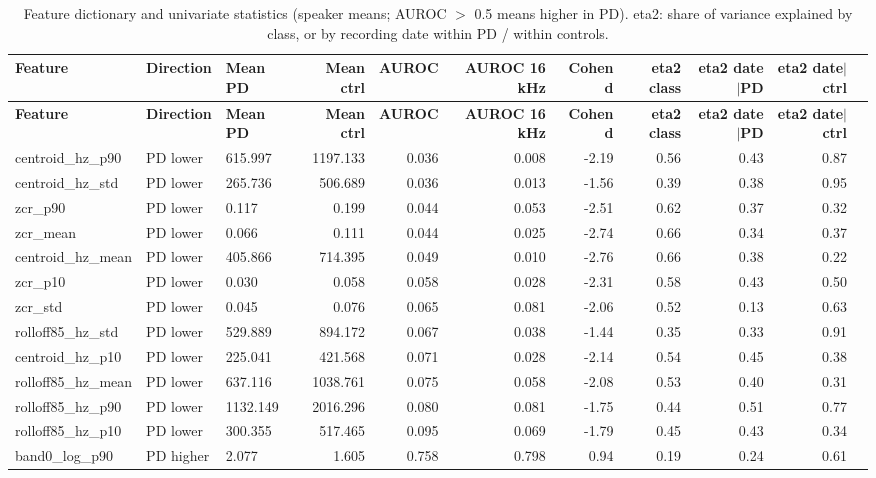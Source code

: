 \documentclass[10pt,a4paper]{article}
\begin{document}
\begin{center}\tiny\renewcommand{\arraystretch}{1.12}
\begin{longtable}{lllrrrrrrrr}
\caption{Feature dictionary and univariate statistics (speaker means; AUROC $>$ 0.5 means higher in PD). eta2: share of variance explained by class, or by recording date within PD / within controls.}\\
\toprule
\textbf{Feature} & \textbf{Direction} & \textbf{Mean PD} & \textbf{Mean ctrl} & \textbf{AUROC} & \textbf{AUROC 16 kHz} & \textbf{Cohen d} & \textbf{eta2 class} & \textbf{eta2 date$|$PD} & \textbf{eta2 date$|$ctrl}\\\midrule\endfirsthead
\toprule
\textbf{Feature} & \textbf{Direction} & \textbf{Mean PD} & \textbf{Mean ctrl} & \textbf{AUROC} & \textbf{AUROC 16 kHz} & \textbf{Cohen d} & \textbf{eta2 class} & \textbf{eta2 date$|$PD} & \textbf{eta2 date$|$ctrl}\\\midrule\endhead
\bottomrule\endfoot
centroid\_hz\_p90 & PD lower & 615.997 & 1197.133 & 0.036 & 0.008 & -2.19 & 0.56 & 0.43 & 0.87\\
centroid\_hz\_std & PD lower & 265.736 & 506.689 & 0.036 & 0.013 & -1.56 & 0.39 & 0.38 & 0.95\\
zcr\_p90 & PD lower & 0.117 & 0.199 & 0.044 & 0.053 & -2.51 & 0.62 & 0.37 & 0.32\\
zcr\_mean & PD lower & 0.066 & 0.111 & 0.044 & 0.025 & -2.74 & 0.66 & 0.34 & 0.37\\
centroid\_hz\_mean & PD lower & 405.866 & 714.395 & 0.049 & 0.010 & -2.76 & 0.66 & 0.38 & 0.22\\
zcr\_p10 & PD lower & 0.030 & 0.058 & 0.058 & 0.028 & -2.31 & 0.58 & 0.43 & 0.50\\
zcr\_std & PD lower & 0.045 & 0.076 & 0.065 & 0.081 & -2.06 & 0.52 & 0.13 & 0.63\\
rolloff85\_hz\_std & PD lower & 529.889 & 894.172 & 0.067 & 0.038 & -1.44 & 0.35 & 0.33 & 0.91\\
centroid\_hz\_p10 & PD lower & 225.041 & 421.568 & 0.071 & 0.028 & -2.14 & 0.54 & 0.45 & 0.38\\
rolloff85\_hz\_mean & PD lower & 637.116 & 1038.761 & 0.075 & 0.058 & -2.08 & 0.53 & 0.40 & 0.31\\
rolloff85\_hz\_p90 & PD lower & 1132.149 & 2016.296 & 0.080 & 0.081 & -1.75 & 0.44 & 0.51 & 0.77\\
rolloff85\_hz\_p10 & PD lower & 300.355 & 517.465 & 0.095 & 0.069 & -1.79 & 0.45 & 0.43 & 0.34\\
band0\_log\_p90 & PD higher & 2.077 & 1.605 & 0.758 & 0.798 & 0.94 & 0.19 & 0.24 & 0.61\\

\end{longtable}
\end{center}
\end{document}
